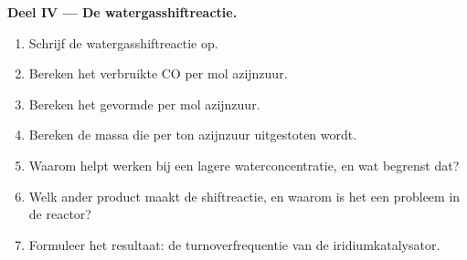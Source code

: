 \begin{problem}
\medskip\noindent\textbf{Deel IV --- De watergasshiftreactie.}
\begin{enumerate}[resume]
  \item Schrijf de watergasshiftreactie op.
  \item Bereken het verbruikte CO per mol azijnzuur.
  \item Bereken het gevormde  per mol azijnzuur.
  \item Bereken de massa  die per ton azijnzuur uitgestoten wordt.
  \item Waarom helpt werken bij een lagere waterconcentratie, en wat
        begrenst dat?
  \item Welk ander product maakt de shiftreactie, en waarom is het een
        probleem in de reactor?
  \item Formuleer het resultaat: de turnoverfrequentie van de
        iridiumkatalysator.
\end{enumerate}
\end{problem}
